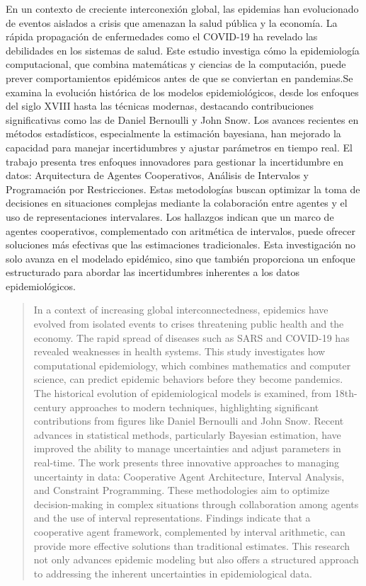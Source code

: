 \begin{resumen}
En un contexto de creciente interconexión global, las epidemias han evolucionado de eventos aislados a crisis que amenazan la salud pública y la economía. 
La rápida propagación de enfermedades como el COVID-19 ha revelado las debilidades en los sistemas de salud. Este estudio investiga cómo la epidemiología 
computacional, que combina matemáticas y ciencias de la computación, puede prever comportamientos epidémicos antes de que se conviertan en pandemias.Se examina
la evolución histórica de los modelos epidemiológicos, desde los enfoques del siglo XVIII hasta las técnicas modernas, destacando contribuciones significativas
como las de Daniel Bernoulli y John Snow. Los avances recientes en métodos estadísticos, especialmente la estimación bayesiana, han mejorado la capacidad para
manejar incertidumbres y ajustar parámetros en tiempo real. El trabajo presenta tres enfoques innovadores para gestionar la incertidumbre en datos: 
Arquitectura de Agentes Cooperativos, Análisis de Intervalos y Programación por Restricciones. Estas metodologías buscan optimizar la toma de decisiones en 
situaciones complejas mediante la colaboración entre agentes y el uso de representaciones intervalares. Los hallazgos indican que un marco de agentes 
cooperativos, complementado con aritmética de intervalos, puede ofrecer soluciones más efectivas que las estimaciones tradicionales. Esta investigación
 no solo avanza en el modelado epidémico, sino que también proporciona un enfoque estructurado para abordar las incertidumbres inherentes a los datos 
epidemiológicos.

\end{resumen}

\begin{abstract}
	In a context of increasing global interconnectedness, epidemics have evolved from isolated events to crises threatening public health and the economy. The rapid spread of diseases such as SARS and COVID-19 has revealed weaknesses in health systems. This study investigates how computational epidemiology, which combines mathematics and computer science, can predict epidemic behaviors before they become pandemics.
	The historical evolution of epidemiological models is examined, from 18th-century approaches to modern techniques, highlighting significant contributions from figures like Daniel Bernoulli and John Snow. Recent advances in statistical methods, particularly Bayesian estimation, have improved the ability to manage uncertainties and adjust parameters in real-time.
	The work presents three innovative approaches to managing uncertainty in data: Cooperative Agent Architecture, Interval Analysis, and Constraint Programming. These methodologies aim to optimize decision-making in complex situations through collaboration among agents and the use of interval representations. Findings indicate that a cooperative agent framework, complemented by interval arithmetic, can provide more effective solutions than traditional estimates. This research not only advances epidemic modeling but also offers a structured approach to addressing the inherent uncertainties in epidemiological data.
\end{abstract}


